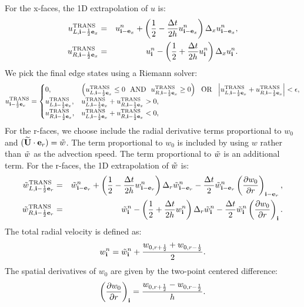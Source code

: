 For the x-faces, the 1D extrapolation of $u$ is:
\begin{eqnarray}
u_{L,{\bf i}-\frac{1}{2}{\bf e}_x}^{\rm TRANS} &=& u_{{\bf i}-{\bf e}_x}^n + \left(\frac{1}{2} - \frac{\Delta t}{2h}u_{{\bf i}-{\bf e}_x}^n\right)\Delta_x u_{{\bf i}-{\bf e}_x}^n, \\
u_{R,{\bf i}-\frac{1}{2}{\bf e}_x}^{\rm TRANS} &=& u_{{\bf i}}^n - \left(\frac{1}{2} + \frac{\Delta t}{2h}u_{{\bf i}}^n\right)\Delta_x u_{{\bf i}}^n.
\end{eqnarray}
We pick the final edge states using a Riemann solver:
\begin{equation}
u^{\rm TRANS}_{{\bf i}-\frac{1}{2}{\bf e}_x} =
\begin{cases}
0, & \left(u_{L,{\bf i}-\frac{1}{2}{\bf e}_x}^{\rm TRANS} \le 0 ~~ {\rm AND} ~~ u_{R,{\bf i}-\frac{1}{2}{\bf e}_x}^{\rm TRANS} \ge 0\right) ~~ {\rm OR} ~~ \left|u_{L,{\bf i}-\frac{1}{2}{\bf e}_x}^{\rm TRANS} + u_{R,{\bf i}-\frac{1}{2}{\bf e}_x}^{\rm TRANS}\right| < \epsilon, \\
u_{L,{\bf i}-\frac{1}{2}{\bf e}_x}^{\rm TRANS}, & u_{L,{\bf i}-\frac{1}{2}{\bf e}_x}^{\rm TRANS} + u_{R,{\bf i}-\frac{1}{2}{\bf e}_x}^{\rm TRANS} > 0, \\
u_{R,{\bf i}-\frac{1}{2}{\bf e}_x}^{\rm TRANS}, & u_{L,{\bf i}-\frac{1}{2}{\bf e}_x}^{\rm TRANS} + u_{R,{\bf i}-\frac{1}{2}{\bf e}_x}^{\rm TRANS} < 0, \\
\end{cases}
\end{equation}
For the r-faces, we choose include the radial derivative terms
proportional to $w_0$ and $(\widetilde{{\bf U}}\cdot{\bf e}_r) = \tilde{w}$.  The term
proportional to $w_0$ is included by using $w$ rather than $\tilde{w}$ as
the advection speed.  The term proportional to $\tilde{w}$ is an additional
term.  For the r-faces, the 1D extrapolation of $\tilde{w}$ is:
\begin{eqnarray}
\tilde{w}_{L,{\bf i}-\frac{1}{2}{\bf e}_r}^{\rm TRANS} &=& \tilde{w}_{{\bf i}-{\bf e}_r}^n + \left(\frac{1}{2} - \frac{\Delta t}{2h}w_{{\bf i}-{\bf e}_r}^n\right)\Delta_r \tilde{w}_{{\bf i}-{\bf e}_r}^n - \frac{\Delta t}{2}\tilde{w}_{{\bf i}-{\bf e}_r}^n\left(\frac{\partial w_0}{\partial r}\right)_{{\bf i}-{\bf e}_r},\label{Radial utrans_L} \\
\tilde{w}_{R,{\bf i}-\frac{1}{2}{\bf e}_r}^{\rm TRANS} &=& \tilde{w}_{{\bf i}}^n - \left(\frac{1}{2} + \frac{\Delta t}{2h}w_{{\bf i}}^n\right)\Delta_r \tilde{w}_{{\bf i}}^n - \frac{\Delta t}{2}\tilde{w}_{{\bf i}}^n\left(\frac{\partial w_0}{\partial r}\right)_{{\bf i}}.\label{Radial utrans_R}
\end{eqnarray}
The total radial velocity is defined as:
\begin{equation}
w_{{\bf i}}^n = \tilde{w}_{{\bf i}}^n + \frac{w_{0,r+\frac{1}{2}}+w_{0,r-\frac{1}{2}}}{2}.\label{Total Radial Velocity}
\end{equation}
The spatial derivatives of $w_0$ are given by the two-point centered
difference:
\begin{equation}
\left(\frac{\partial w_0}{\partial r}\right)_{{\bf i}} = \frac{w_{0,r+\frac{1}{2}}-w_{0,r-\frac{1}{2}}}{h}.\label{Radial Derivative of w_0}
\end{equation}

